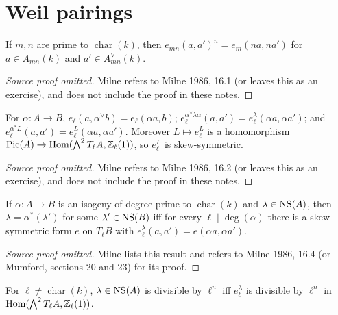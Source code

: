 \section{Weil pairings}
\begin{lemma}\label{lem:milne-weil-pairing-compatibility}
If $m,n$ are prime to $\operatorname{char}(k)$, then $e_{mn}(a,a')^n=e_m(na,na')$ for $a\in A_{mn}(k)$ and $a'\in A^\vee_{mn}(k)$.
\end{lemma}

\begin{proof}[Source proof omitted]
Milne refers to Milne 1986, 16.1 (or leaves this as an exercise), and does not
include the proof in these notes.
\end{proof}
\begin{proposition}\label{prop:milne-weil-pairing-functoriality}
For $\alpha:A\to B$, $e_\ell(a,\alpha^\vee b)=e_\ell(\alpha a,b)$; $e_\ell^{\alpha^\vee\lambda\alpha}(a,a')=e_\ell^\lambda(\alpha a,\alpha a')$; and $e_\ell^{\alpha^*L}(a,a')=e_\ell^L(\alpha a,\alpha a')$. Moreover $L\mapsto e_\ell^L$ is a homomorphism $\operatorname{Pic}(A)\to\operatorname{Hom}(\bigwedge^2T_\ell A,\mathbb{Z}_\ell(1))$, so $e_\ell^L$ is skew-symmetric.
\end{proposition}

\begin{proof}[Source proof omitted]
Milne refers to Milne 1986, 16.2 (or leaves this as an exercise), and does not
include the proof in these notes.
\end{proof}
\begin{theorem}\label{thm:milne-weil-pairing-descent}
If $\alpha:A\to B$ is an isogeny of degree prime to $\operatorname{char}(k)$ and $\lambda\in\operatorname{NS}(A)$, then $\lambda=\alpha^*(\lambda')$ for some $\lambda'\in\operatorname{NS}(B)$ iff for every $\ell\mid\deg(\alpha)$ there is a skew-symmetric form $e$ on $T_\ell B$ with $e_\ell^\lambda(a,a')=e(\alpha a,\alpha a')$.
\end{theorem}

\begin{proof}[Source proof omitted]
Milne lists this result and refers to Milne 1986, 16.4 (or Mumford, sections
20 and 23) for its proof.
\end{proof}
\begin{corollary}\label{cor:milne-weil-pairing-divisibility}
For $\ell\ne\operatorname{char}(k)$, $\lambda\in\operatorname{NS}(A)$ is divisible by $\ell^n$ iff $e_\ell^\lambda$ is divisible by $\ell^n$ in $\operatorname{Hom}(\bigwedge^2T_\ell A,\mathbb{Z}_\ell(1))$.
\end{corollary}

